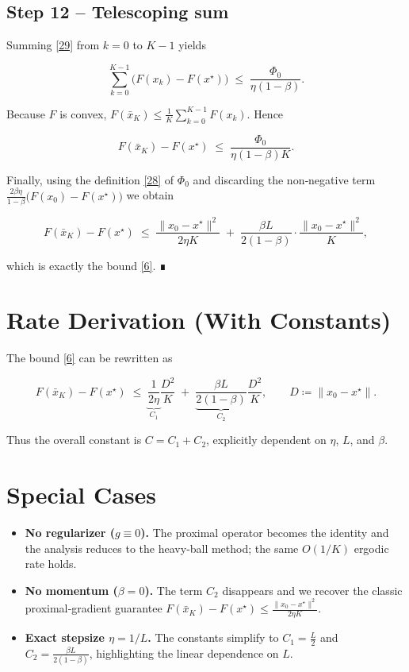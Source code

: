 \documentclass{article}
\begin{document}
\subsection*{Step 12 – Telescoping sum}
Summing \eqref{29} from $k=0$ to $K-1$ yields  

\[
\sum_{k=0}^{K-1}\bigl(F(x_k)-F(x^\star)\bigr)
\;\le\;
\frac{\Phi_0}{\eta(1-\beta)} .
\tag{33}
\]

Because $F$ is convex, $F(\bar{x}_K)\le\frac{1}{K}\sum_{k=0}^{K-1}F(x_k)$. Hence  

\[
F(\bar{x}_K)-F(x^\star)
\;\le\;
\frac{\Phi_0}{\eta(1-\beta)K}.
\tag{34}
\]

Finally, using the definition \eqref{28} of $\Phi_0$ and discarding the non‑negative term
$\frac{2\beta\eta}{1-\beta}\bigl(F(x_0)-F(x^\star)\bigr)$ we obtain  

\[
F(\bar{x}_K)-F(x^\star)
\;\le\;
\frac{\|x_0-x^\star\|^{2}}{2\eta K}
\;+\;
\frac{\beta L}{2(1-\beta)}\cdot\frac{\|x_0-x^\star\|^{2}}{K},
\]

which is exactly the bound \eqref{6}.  ∎

\section*{Rate Derivation (With Constants)}
The bound \eqref{6} can be rewritten as  

\[
F(\bar{x}_K)-F(x^\star)\;\le\;
\underbrace{\frac{1}{2\eta}}_{C_1}\frac{D^{2}}{K}
\;+\;
\underbrace{\frac{\beta L}{2(1-\beta)}}_{C_2}\frac{D^{2}}{K},
\qquad D\coloneqq\|x_0-x^\star\|.
\]

Thus the overall constant is $C=C_1+C_2$, explicitly dependent on $\eta$, $L$, and $\beta$.

\section*{Special Cases}
\begin{itemize}
  \item \textbf{No regularizer ($g\equiv0$).} The proximal operator becomes the identity and the analysis reduces to the heavy‑ball method; the same $O(1/K)$ ergodic rate holds.
  \item \textbf{No momentum ($\beta=0$).} The term $C_2$ disappears and we recover the classic proximal‑gradient guarantee $F(\bar{x}_K)-F(x^\star)\le \frac{\|x_0-x^\star\|^{2}}{2\eta K}$.
  \item \textbf{Exact stepsize $\eta=1/L$.} The constants simplify to $C_1=\frac{L}{2}$ and $C_2=\frac{\beta L}{2(1-\beta)}$, highlighting the linear dependence on $L$.
\end{itemize}
\end{document}
